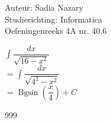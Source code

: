 \documentclass[a4paper]{article}
\newcommand{\dint}{\displaystyle\int}
\newcommand{\Bgsin}{\operatorname{Bgsin}}
\begin{document}
\noindent \large Auteur: Sadia Nazary \\
\noindent \large Studierichting: Informatica \\
\noindent \large Oefeningenreeks 4A nr. 40.6 \\

\medskip

\normalsize

$\dint \dfrac{dx}{\sqrt{16-x^2}}$ \\

$=\dint \dfrac{dx}{\sqrt{4^2-x^2}}$ \\

$=\Bgsin\left(\dfrac{x}{4}\right) + C$ \\


\begin{thebibliography}{999}
\end{thebibliography}
\end{document}
